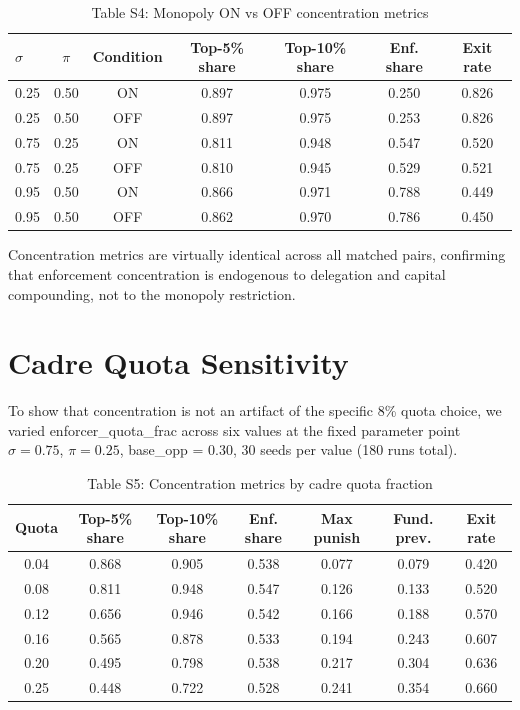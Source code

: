 \documentclass[12pt]{article}
\begin{document}
\begin{table}[h]
\centering
\caption{Table S4: Monopoly ON vs OFF concentration metrics}
\begin{tabular}{lcccccc}
\toprule
$\sigma$ & $\pi$ & Condition & Top-5\% share & Top-10\% share & Enf. share & Exit rate \\
\midrule
0.25 & 0.50 & ON  & 0.897 & 0.975 & 0.250 & 0.826 \\
0.25 & 0.50 & OFF & 0.897 & 0.975 & 0.253 & 0.826 \\
0.75 & 0.25 & ON  & 0.811 & 0.948 & 0.547 & 0.520 \\
0.75 & 0.25 & OFF & 0.810 & 0.945 & 0.529 & 0.521 \\
0.95 & 0.50 & ON  & 0.866 & 0.971 & 0.788 & 0.449 \\
0.95 & 0.50 & OFF & 0.862 & 0.970 & 0.786 & 0.450 \\
\bottomrule
\end{tabular}
\end{table}

Concentration metrics are virtually identical across all matched pairs, confirming that enforcement concentration is endogenous to delegation and capital compounding, not to the monopoly restriction.


\section{Cadre Quota Sensitivity}

To show that concentration is not an artifact of the specific 8\% quota choice, we varied enforcer\_quota\_frac across six values at the fixed parameter point $\sigma = 0.75$, $\pi = 0.25$, base\_opp = 0.30, 30 seeds per value (180 runs total).

\begin{table}[h]
\centering
\caption{Table S5: Concentration metrics by cadre quota fraction}
\begin{tabular}{ccccccc}
\toprule
Quota & Top-5\% share & Top-10\% share & Enf. share & Max punish & Fund. prev. & Exit rate \\
\midrule
0.04 & 0.868 & 0.905 & 0.538 & 0.077 & 0.079 & 0.420 \\
0.08 & 0.811 & 0.948 & 0.547 & 0.126 & 0.133 & 0.520 \\
0.12 & 0.656 & 0.946 & 0.542 & 0.166 & 0.188 & 0.570 \\
0.16 & 0.565 & 0.878 & 0.533 & 0.194 & 0.243 & 0.607 \\
0.20 & 0.495 & 0.798 & 0.538 & 0.217 & 0.304 & 0.636 \\
0.25 & 0.448 & 0.722 & 0.528 & 0.241 & 0.354 & 0.660 \\
\bottomrule
\end{tabular}
\end{table}
\end{document}
